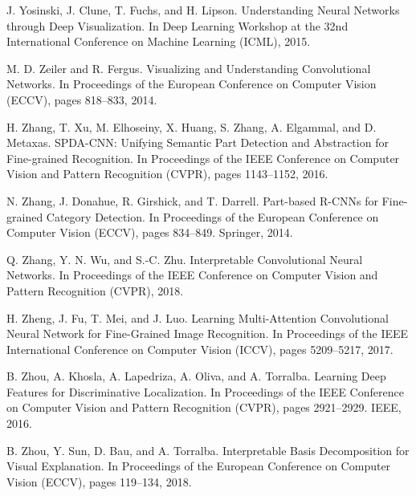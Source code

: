\documentclass{article}
\theoremstyle{definition}
\theoremstyle{remark}
\begin{document}
\begin{thebibliography}{}
 J. Yosinski, J. Clune, T. Fuchs, and H. Lipson. Understanding Neural Networks through Deep Visualization. In Deep Learning Workshop at the 32nd International Conference on Machine Learning (ICML), 2015.

 M. D. Zeiler and R. Fergus. Visualizing and Understanding Convolutional Networks. In Proceedings of the European Conference on Computer Vision (ECCV), pages 818–833, 2014.

 H. Zhang, T. Xu, M. Elhoseiny, X. Huang, S. Zhang, A. Elgammal, and D. Metaxas. SPDA-CNN: Unifying Semantic Part Detection and Abstraction for Fine-grained Recognition. In Proceedings of the IEEE Conference on Computer Vision and Pattern Recognition (CVPR), pages 1143–1152, 2016.

 N. Zhang, J. Donahue, R. Girshick, and T. Darrell. Part-based R-CNNs for Fine-grained Category Detection. In Proceedings of the European Conference on Computer Vision (ECCV), pages 834–849. Springer, 2014.

 Q. Zhang, Y. N. Wu, and S.-C. Zhu. Interpretable Convolutional Neural Networks. In Proceedings of the IEEE Conference on Computer Vision and Pattern Recognition (CVPR), 2018.

 H. Zheng, J. Fu, T. Mei, and J. Luo. Learning Multi-Attention Convolutional Neural Network for Fine-Grained Image Recognition. In Proceedings of the IEEE International Conference on Computer Vision (ICCV), pages 5209–5217, 2017.

 B. Zhou, A. Khosla, A. Lapedriza, A. Oliva, and A. Torralba. Learning Deep Features for Discriminative Localization. In Proceedings of the IEEE Conference on Computer Vision and Pattern Recognition (CVPR), pages 2921–2929. IEEE, 2016.

 B. Zhou, Y. Sun, D. Bau, and A. Torralba. Interpretable Basis Decomposition for Visual Explanation. In Proceedings of the European Conference on Computer Vision (ECCV), pages 119–134, 2018.

\end{thebibliography}
\end{document}
